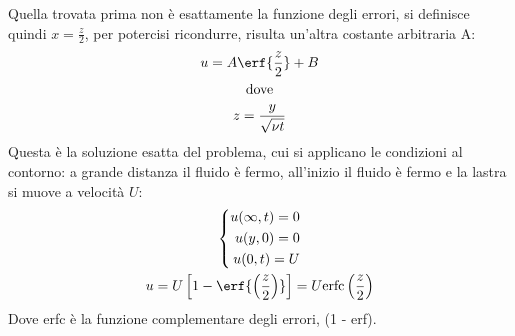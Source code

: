 Quella trovata prima non è esattamente la funzione degli errori, si definisce quindi $x = \frac{z}{2}$, per potercisi ricondurre, risulta un'altra costante arbitraria A:
	\begin{equation*}
		\begin{gathered}
			u = A \erf{\frac{z}{2}} + B\\
			\text{dove}\\
			z = \frac{y}{\sqrt{\nu t}}
		\end{gathered}
	\end{equation*}
Questa è la soluzione esatta del problema, cui si applicano le condizioni al contorno: a grande distanza il fluido è fermo, all'inizio il fluido è fermo e la lastra si muove a velocità $U$:
%
	\begin{equation*}
		\begin{gathered}
			\left\{
				\begin{aligned}
					u(\infty,t) = 0\\
					u(y, 0) = 0\\
					u(0, t) = U\\
				\end{aligned}
			\right.\\
			u = U \left[ 1 - \erf{\left( \frac{z}{2} \right)} \right] = U \textrm{erfc}\left( \frac{z}{2} \right)
		\end{gathered}
	\end{equation*}
%
Dove erfc è la funzione complementare degli errori, (1 - erf).
